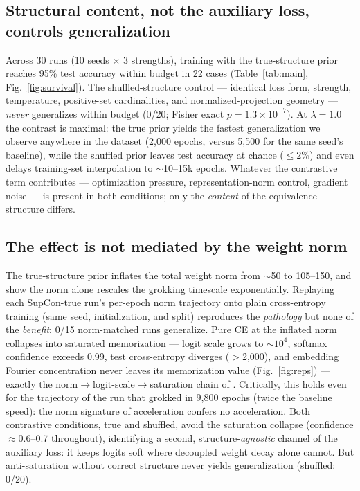 \documentclass[11pt]{article}
\begin{document}
\subsection{Structural content, not the auxiliary loss, controls generalization}
Across 30 runs (10 seeds $\times$ 3 strengths), training with the true-structure prior reaches
95\% test accuracy within budget in 22 cases (Table~\ref{tab:main},
Fig.~\ref{fig:survival}). The shuffled-structure control --- identical loss form, strength,
temperature, positive-set cardinalities, and normalized-projection geometry --- \emph{never}
generalizes within budget (0/20; Fisher exact $p=1.3\times10^{-7}$). At $\lambda{=}1.0$ the
contrast is maximal: the true prior yields the fastest generalization we observe anywhere in the
dataset (2{,}000 epochs, versus 5{,}500 for the same seed's baseline), while the shuffled prior
leaves test accuracy at chance ($\leq 2\%$) and even delays training-set interpolation to
$\sim$10--15k epochs. Whatever the contrastive term contributes --- optimization pressure,
representation-norm control, gradient noise --- is present in both conditions; only the
\emph{content} of the equivalence structure differs.

\subsection{The effect is not mediated by the weight norm}
The true-structure prior inflates the total weight norm from $\sim$50 to 105--150, and
\citet{weightnormdelay2026} show the norm alone rescales the grokking timescale exponentially.
Replaying each SupCon-true run's per-epoch norm trajectory onto plain cross-entropy training
(same seed, initialization, and split) reproduces the \emph{pathology} but none of the
\emph{benefit}: 0/15 norm-matched runs generalize. Pure CE at the inflated norm collapses into
saturated memorization --- logit scale grows to $\sim$$10^4$, softmax confidence exceeds 0.99,
test cross-entropy diverges ($>$2{,}000), and embedding Fourier concentration never leaves its
memorization value (Fig.~\ref{fig:reps}) --- exactly the norm$\to$logit-scale$\to$saturation
chain of \citet{logitscale2026}. Critically, this holds even for the trajectory of the run that
grokked in 9{,}800 epochs (twice the baseline speed): the norm signature of acceleration confers
no acceleration. Both contrastive conditions, true and shuffled, avoid the saturation collapse
(confidence $\approx$0.6--0.7 throughout), identifying a second, structure-\emph{agnostic} channel
of the auxiliary loss: it keeps logits soft where decoupled weight decay alone cannot. But
anti-saturation without correct structure never yields generalization (shuffled: 0/20).
\end{document}
